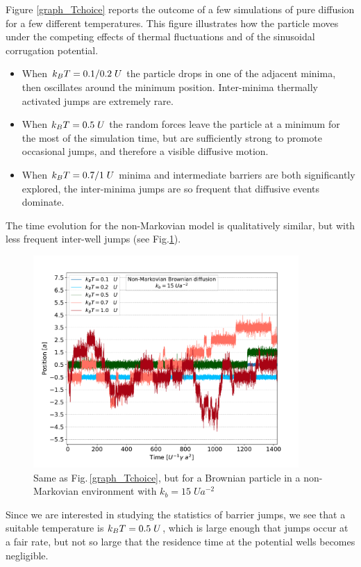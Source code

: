 Figure \ref{graph_Tchoice} reports the outcome of a few simulations of pure diffusion for a few different temperatures.
This figure illustrates how the particle moves under the competing effects of thermal fluctuations and of the sinusoidal corrugation potential.
\begin{itemize}[label={\scalebox{0.4}{$\blacksquare$}}]
    \item When $k_BT=0.1/0.2 \hspace{0.1cm}U$ the particle drops in one of the adjacent minima, then oscillates around the minimum position. Inter-minima thermally activated jumps are extremely rare.
    \item When $k_BT=0.5\hspace{0.1cm}U$ the random forces leave the particle at a minimum for the most of the simulation time, but are sufficiently strong to promote occasional jumps, and therefore a visible diffusive motion.
    \item When $k_BT=0.7 / 1\hspace{0.1cm}U$ minima and intermediate barriers are both significantly explored, the inter-minima jumps are so frequent that diffusive events dominate.
\end{itemize}
The time evolution for the non-Markovian model is qualitatively similar, but with less frequent inter-well jumps (see Fig.\;\ref{fig:T_kb15}).
\begin{figure}
    \centering
    \includegraphics[width=0.9\textwidth]{scelta_temperatura_kb15.pdf}
    \caption{Same as Fig.\,\ref{graph_Tchoice}, but for a Brownian particle in a non-Markovian  environment with $k_b=15\; Ua^{-2}$}
    \label{fig:T_kb15}
\end{figure}
Since we are interested in studying the statistics of barrier jumps, we see that a suitable temperature is $k_BT = 0.5\hspace{0.1cm}U$, which is large enough that jumps occur at a fair rate, but not so large that the residence time at the potential wells becomes negligible.
